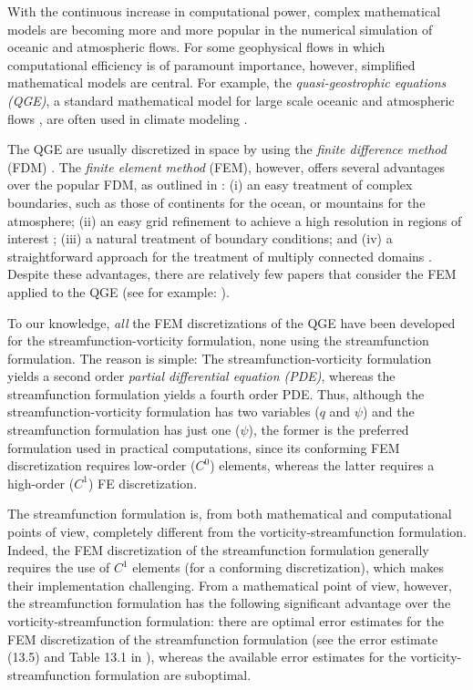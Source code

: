 With the continuous increase in computational power, complex mathematical models
are becoming more and more popular in the numerical simulation of oceanic and
atmospheric flows. For some geophysical flows in which computational efficiency
is of paramount importance, however, simplified mathematical models are central.
For example, the \emph{quasi-geostrophic equations (QGE)}, a standard
mathematical model for large scale oceanic and atmospheric flows
\cite{Cushman11,Majda,Pedlosky92,Vallis06}, are often used in climate modeling
\cite{Dijkstra05}.

The QGE are usually discretized in space by using the \emph{finite difference
method} (FDM) \cite{San11}. The \emph{finite element method} (FEM), however,
offers several advantages over the popular FDM, as outlined in \cite{Myers}: (i)
an easy treatment of complex boundaries, such as those of continents for the
ocean, or mountains for the atmosphere; (ii) an easy grid refinement to achieve
a high resolution in regions of interest \cite{Cascon}; (iii) a natural
treatment of boundary conditions; and (iv) a straightforward approach for the
treatment of multiply connected domains \cite{Myers}. Despite these advantages,
there are relatively few papers that consider the FEM applied to the QGE (see
for example: \cite{Cascon, Fix, LeProvost94, Myers, Stevens82}).

To our knowledge, \emph{all} the FEM discretizations of the QGE have been
developed for the streamfunction-vorticity formulation, none using the
streamfunction formulation. The reason is simple: The streamfunction-vorticity
formulation yields a second order \emph{partial differential equation (PDE)},
whereas the streamfunction formulation yields a fourth order PDE. Thus, although
the streamfunction-vorticity formulation has two variables ($q$ and $\psi$) and
the streamfunction formulation has just one ($\psi$), the former is the
preferred formulation used in practical computations, since its conforming FEM
discretization requires low-order ($C^0$) elements, whereas the latter requires
a high-order ($C^1$) FE discretization.

The streamfunction formulation is, from both mathematical and computational
points of view, completely different from the vorticity-streamfunction
formulation. Indeed, the FEM discretization of the streamfunction formulation
generally requires the use of $C^1$ elements (for a conforming discretization),
which makes their implementation challenging. From a mathematical point of view,
however, the streamfunction formulation has the following significant advantage
over the vorticity-streamfunction formulation: there are optimal error estimates
for the FEM discretization of the streamfunction formulation (see the error
estimate (13.5) and Table 13.1 in \cite{Gunzburger89}), whereas the available
error estimates for the vorticity-streamfunction formulation are suboptimal.

